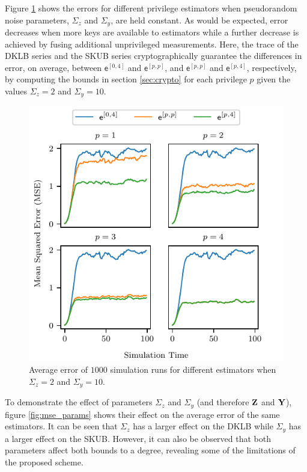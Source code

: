 \documentclass[conference]{IEEEtran}
\theoremstyle{definition}
\theoremstyle{remark}
\begin{document}
Figure \ref{fig:mse_privs} shows the errors for different privilege estimators when pseudorandom noise parameters, $\Sigma_z$ and $\Sigma_y$, are held constant. As would be expected, error decreases when more keys are available to estimators while a further decrease is achieved by fusing additional unprivileged measurements. Here, the trace of the DKLB series and the SKUB series cryptographically guarantee the differences in error, on average, between $\mathsf{e}^{[0,4]}$ and $\mathsf{e}^{[p,p]}$, and $\mathsf{e}^{[p,p]}$ and $\mathsf{e}^{[p,4]}$, respectively, by computing the bounds in section \ref{sec:crypto} for each privilege $p$ given the values $\Sigma_z=2$ and $\Sigma_y=10$.
\begin{figure}[htbp]
  \centering
  \includegraphics{figures/mse_privs.pdf}
  \caption{Average error of $1000$ simulation runs for different estimators when $\Sigma_z=2$ and $\Sigma_y=10$.}
  \label{fig:mse_privs}
\end{figure}
To demonstrate the effect of parameters $\Sigma_z$ and $\Sigma_y$ (and therefore ${{\mathbf{Z}}}$ and ${{\mathbf{Y}}}$), figure \ref{fig:mse_params} shows their effect on the average error of the same estimators. It can be seen that $\Sigma_z$ has a larger effect on the DKLB while $\Sigma_y$ has a larger effect on the SKUB. However, it can also be observed that both parameters affect both bounds to a degree, revealing some of the limitations of the proposed scheme.
\end{document}
